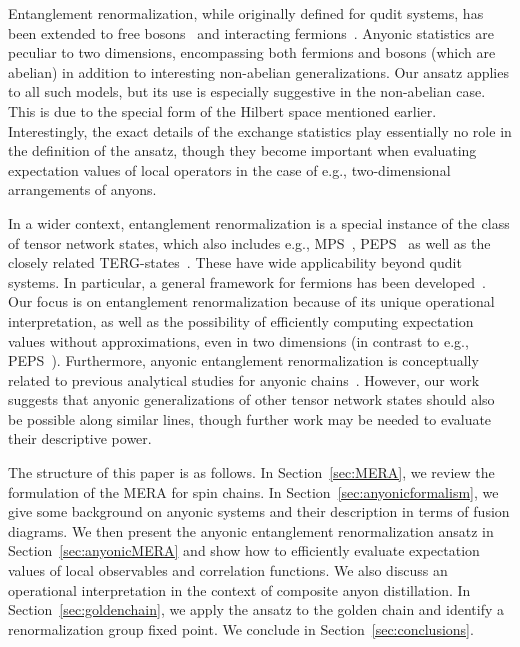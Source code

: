 \documentclass[floats,prb,twocolumn]{revtex4}
\begin{document}
Entanglement renormalization, while originally defined for qudit systems, has been extended  to free bosons~\cite{EvenblyVidal10} and interacting fermions~\cite{CorbozVidal09}. Anyonic statistics are peculiar to two dimensions, encompassing both fermions and bosons (which are abelian) in addition to interesting non-abelian generalizations. Our ansatz applies to all such models, but its use is especially suggestive in the non-abelian case. This is due to the special form of the  Hilbert space mentioned earlier. Interestingly, the exact details of the exchange statistics play essentially no role in the definition of the ansatz,  though they become important when evaluating expectation values of local operators in the case of e.g., two-dimensional arrangements of anyons. 
 
In a wider context, entanglement renormalization is a special instance of the class of tensor network states, which also includes e.g., MPS~\cite{VerstraeteCirac06,Rom97,Vid04,Verstr04,VerstrMurgCirac08}, PEPS~\cite{VerstraeteCirac04PEPS} as well as the closely related TERG-states~\cite{GuLevinWen08}. These have wide applicability beyond qudit systems. In particular, a general framework for fermions has been developed~\cite{PizornVerstraete10,Kraus10,Corbozorusetal10,Pinedaetal10,Bartheletal09}. Our focus is on entanglement renormalization because of its unique operational interpretation, as well as the possibility of efficiently computing expectation values without approximations, even in two dimensions (in contrast to e.g., PEPS~\cite{SchuchetalPEPScomp07}). Furthermore, anyonic entanglement renormalization is conceptually related to previous analytical studies for anyonic chains~\cite{BonesteelYang07,Fidkowskietalrandom,Fidkowskietal08b}.   However, our work suggests that anyonic generalizations of other tensor network states should also be possible along similar lines, though further work may be needed to evaluate their descriptive power. 
  
The structure of this paper is as follows. In Section~\ref{sec:MERA}, we review the formulation of the MERA for spin chains.  In Section~\ref{sec:anyonicformalism}, we  give some background on anyonic systems and their description in terms of fusion diagrams.  We then present the anyonic entanglement renormalization ansatz in Section~\ref{sec:anyonicMERA} and  show how to efficiently evaluate expectation values of local observables and correlation functions. We also discuss an operational interpretation in the context of composite anyon distillation.   In Section~\ref{sec:goldenchain}, we apply the ansatz to the golden chain and identify a renormalization group fixed point. We conclude in Section~\ref{sec:conclusions}.  
\end{document}
